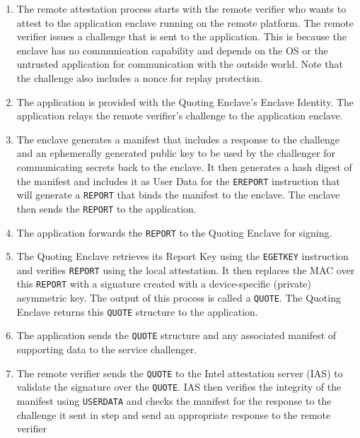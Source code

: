 \begin{enumerate}
  \item[\one] The remote attestation process starts with the remote verifier who wants to attest to the application enclave running on the remote platform. The remote verifier issues a challenge that is sent to the application. This is because the enclave has no communication capability and depends on the OS or the untrusted application for communication with the outside world. Note that the challenge also includes a nonce for replay protection.
    
  \item[\two] The application is provided with the Quoting Enclave's Enclave Identity. The application relays the remote verifier's challenge to the application enclave.
  
  \item[\three] The enclave generates a manifest that includes a response to the challenge and an ephemerally generated public key to be used by the challenger for communicating secrets back to the enclave. It then generates a hash digest of the manifest and includes it as User Data for the \texttt{EREPORT} instruction that will generate a \texttt{REPORT} that binds the manifest to the enclave. The enclave then sends the \texttt{REPORT} to the application.
  
  \item[\four] The application forwards the \texttt{REPORT} to the Quoting Enclave for signing.
  
  \item[\five]The Quoting Enclave retrieves its Report Key using the \texttt{EGETKEY} instruction and verifies \texttt{REPORT} using the local attestation. It then replaces the MAC over this \texttt{REPORT} with a signature created with a device-specific (private) asymmetric key. The output of this process is called a \texttt{QUOTE}. The Quoting Enclave returns this \texttt{QUOTE} structure to the application. 
  
  \item[\six] The application sends the \texttt{QUOTE} structure and any associated manifest of supporting data to the service challenger.
  
  \item[\seven] The remote verifier sends the \texttt{QUOTE} to the Intel attestation server (IAS) to validate the signature over the \texttt{QUOTE}. IAS then verifies the integrity of the manifest using \texttt{USERDATA} and checks the manifest for the response to the challenge it sent in step \one and send an appropriate response to the remote verifier
 
\end{enumerate} 


